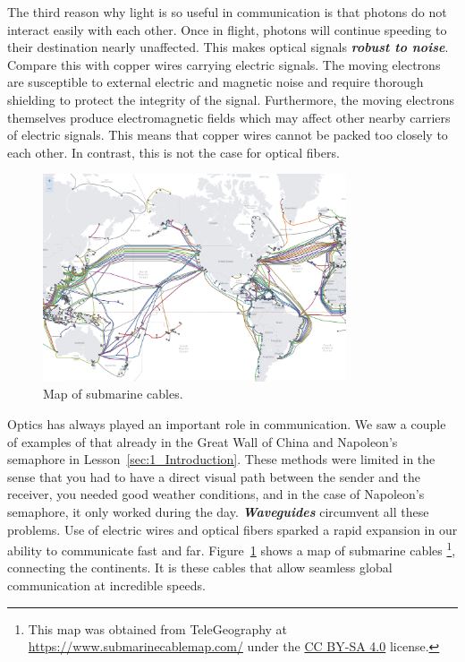 The third reason why light is so useful in communication is that photons do not interact easily with each other.
Once in flight, photons will continue speeding to their destination nearly unaffected.
This makes optical signals \textit{\textbf{robust to noise}}.
Compare this with copper wires carrying electric signals.
The moving electrons are susceptible to external electric and magnetic noise and require thorough shielding to protect the integrity of the signal.
Furthermore, the moving electrons themselves produce electromagnetic fields which may affect other nearby carriers of electric signals.
This means that copper wires cannot be packed too closely to each other.
In contrast, this is not the case for optical fibers.

\begin{figure}[t]
    \centering
    \includegraphics[width=0.8\textwidth]{lesson5/5-1_underwater_cable_map.png}
    \caption[Underwater cabel map]{Map of submarine cables.}
    \label{fig:5-1_underwater_cable_map}
\end{figure}

Optics has always played an important role in communication.
We saw a couple of examples of that already in the Great Wall of China and Napoleon's semaphore in Lesson~\ref{sec:1_Introduction}.
These methods were limited in the sense that you had to have a direct visual path between the sender and the receiver, you needed good weather conditions, and in the case of Napoleon's semaphore, it only worked during the day.
\textit{\textbf{Waveguides}} circumvent all these problems.
Use of electric wires and optical fibers sparked a rapid expansion in our ability to communicate fast and far.
Figure~\ref{fig:5-1_underwater_cable_map} shows a map of submarine cables \footnote{This map was obtained from TeleGeography at \href{https://www.submarinecablemap.com/}{https://www.submarinecablemap.com/} under the \href{https://creativecommons.org/licenses/by-sa/4.0/}{CC BY-SA 4.0} license.}, connecting the continents.
It is these cables that allow seamless global communication at incredible speeds.

